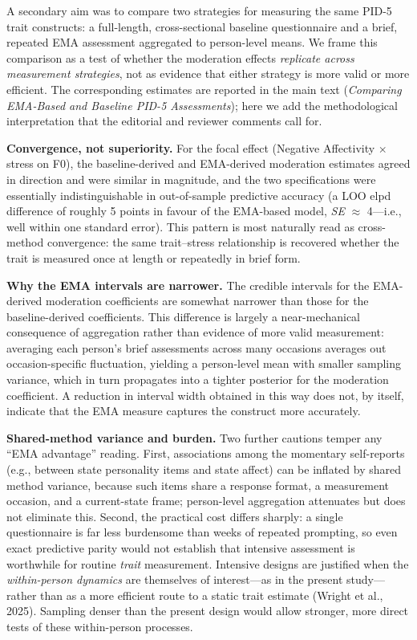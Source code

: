 \documentclass[
  english,
  man,floatsintext]{apa6}
\begin{document}
A secondary aim was to compare two strategies for measuring the same PID-5 trait constructs: a full-length, cross-sectional baseline questionnaire and a brief, repeated EMA assessment aggregated to person-level means. We frame this comparison as a test of whether the moderation effects \emph{replicate across measurement strategies}, not as evidence that either strategy is more valid or more efficient. The corresponding estimates are reported in the main text (\emph{Comparing EMA-Based and Baseline PID-5 Assessments}); here we add the methodological interpretation that the editorial and reviewer comments call for.

\textbf{Convergence, not superiority.} For the focal effect (Negative Affectivity \(\times\) stress on F0), the baseline-derived and EMA-derived moderation estimates agreed in direction and were similar in magnitude, and the two specifications were essentially indistinguishable in out-of-sample predictive accuracy (a LOO elpd difference of roughly 5 points in favour of the EMA-based model, \emph{SE} \(\approx\) 4---i.e., well within one standard error). This pattern is most naturally read as cross-method convergence: the same trait--stress relationship is recovered whether the trait is measured once at length or repeatedly in brief form.

\textbf{Why the EMA intervals are narrower.} The credible intervals for the EMA-derived moderation coefficients are somewhat narrower than those for the baseline-derived coefficients. This difference is largely a near-mechanical consequence of aggregation rather than evidence of more valid measurement: averaging each person's brief assessments across many occasions averages out occasion-specific fluctuation, yielding a person-level mean with smaller sampling variance, which in turn propagates into a tighter posterior for the moderation coefficient. A reduction in interval width obtained in this way does not, by itself, indicate that the EMA measure captures the construct more accurately.

\textbf{Shared-method variance and burden.} Two further cautions temper any ``EMA advantage'' reading. First, associations among the momentary self-reports (e.g., between state personality items and state affect) can be inflated by shared method variance, because such items share a response format, a measurement occasion, and a current-state frame; person-level aggregation attenuates but does not eliminate this. Second, the practical cost differs sharply: a single questionnaire is far less burdensome than weeks of repeated prompting, so even exact predictive parity would not establish that intensive assessment is worthwhile for routine \emph{trait} measurement. Intensive designs are justified when the \emph{within-person dynamics} are themselves of interest---as in the present study---rather than as a more efficient route to a static trait estimate (Wright et al., 2025). Sampling denser than the present design would allow stronger, more direct tests of these within-person processes.
\end{document}
